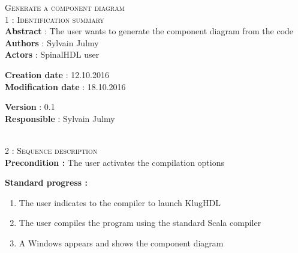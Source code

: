 \begin{flushleft}
    \textsc{\huge Generate a component diagram}\\[0.5cm]

    \BlackLine
    \textsc{\Large 1 : Identification summary}\\[0.3cm]

        \textbf{\large Abstract} : The user wants to generate the component diagram from the code \\[0.1cm]

        \textbf{\large Authors} : Sylvain Julmy \\[0.3cm]			

        \textbf{\large Actors} : SpinalHDL user \\[0.1cm]	
    \begin{minipage}{0.40\textwidth}
        \begin{flushleft}	
            \textbf{\large Creation date} : 12.10.2016 \\[0.1cm]

            \textbf{\large Modification date} : 18.10.2016 \\[0.1cm]
        \end{flushleft}
    \end{minipage}
    \begin{minipage}{0.40\textwidth}
        \begin{flushleft}
            \textbf{\large Version} : 0.1 \\[0.1cm]

            \textbf{\large Responsible} : Sylvain Julmy \\[0.1cm]
        \end{flushleft}
    \end{minipage}
    \\[0.5cm]
    \BlackLine
    \textsc{\Large 2 : Sequence description}\\[0.3cm]

    \textbf{\large Precondition :} The user activates the compilation options

    \textbf{\large  Standard progress :}
    \begin{enumerate}[nosep]
        \item The user indicates to the compiler to launch KlugHDL
        \item The user compiles the program using the standard Scala compiler
        \item A Windows appears and shows the component diagram
    \end{enumerate}


\end{flushleft}
